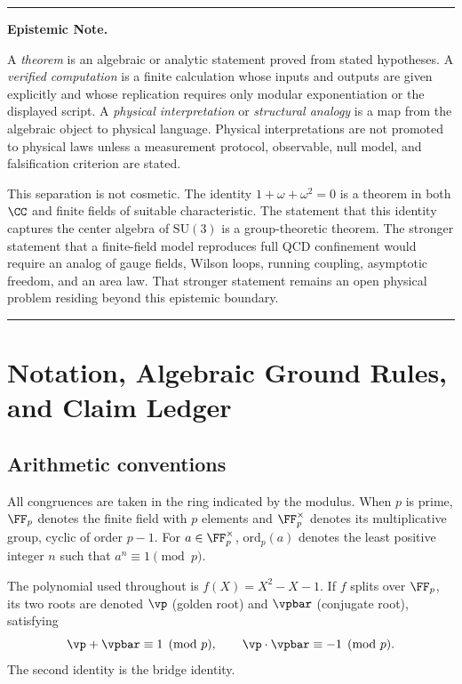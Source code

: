 \newpage

\newpage

\vspace{0.5em}
\noindent\rule{\linewidth}{0.4pt}
{\small\noindent\textbf{Epistemic Note.}

A \emph{theorem} is an algebraic or analytic statement proved from stated hypotheses. A \emph{verified computation} is a finite calculation whose inputs and outputs are given explicitly and whose replication requires only modular exponentiation or the displayed script. A \emph{physical interpretation} or \emph{structural analogy} is a map from the algebraic object to physical language. Physical interpretations are not promoted to physical laws unless a measurement protocol, observable, null model, and falsification criterion are stated.

This separation is not cosmetic. The identity $1 + \omega + \omega^2 = 0$ is a theorem in both $\CC$ and finite fields of suitable characteristic. The statement that this identity captures the center algebra of $\mathrm{SU}(3)$ is a group-theoretic theorem. The stronger statement that a finite-field model reproduces full QCD confinement would require an analog of gauge fields, Wilson loops, running coupling, asymptotic freedom, and an area law. That stronger statement remains an open physical problem residing beyond this epistemic boundary.}
\noindent\rule{\linewidth}{0.4pt}
\vspace{0.5em}

\section{Notation, Algebraic Ground Rules, and Claim Ledger}

\subsection{Arithmetic conventions}

All congruences are taken in the ring indicated by the modulus. When $p$ is prime, $\FF_p$ denotes the finite field with $p$ elements and $\FF_p^\times$ denotes its multiplicative group, cyclic of order $p - 1$. For $a \in \FF_p^\times$, $\mathrm{ord}_p(a)$ denotes the least positive integer $n$ such that $a^n \equiv 1 \pmod{p}$.

The polynomial used throughout is $f(X) = X^2 - X - 1$. If $f$ splits over $\FF_p$, its two roots are denoted $\vp$ (golden root) and $\vpbar$ (conjugate root), satisfying
\[
\vp + \vpbar \equiv 1 \pmod{p}, \qquad \vp \cdot \vpbar \equiv -1 \pmod{p}.
\]
The second identity is the bridge identity.

